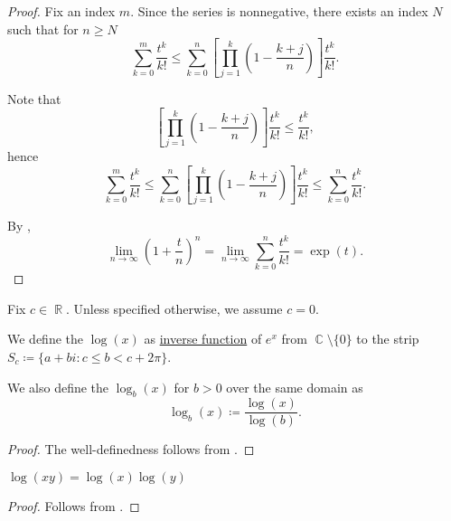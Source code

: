 \begin{proof}
  Fix an index \( m \). Since the series is nonnegative, there exists an index \( N \) such that for \( n \geq N \)
  \begin{equation*}
    \sum_{k=0}^m \frac {t^k} {k!}
    \leq
    \sum_{k=0}^n \left[ \prod_{j=1}^k \left(1 - \frac {k+j} n \right) \right] \frac {t^k} {k!}.
  \end{equation*}

  Note that
  \begin{equation*}
    \left[ \prod_{j=1}^k \left(1 - \frac {k+j} n \right) \right] \frac {t^k} {k!}
    \leq
    \frac {t^k} {k!},
  \end{equation*}
  hence
  \begin{equation*}
    \sum_{k=0}^m \frac {t^k} {k!}
    \leq
    \sum_{k=0}^n \left[ \prod_{j=1}^k \left(1 - \frac {k+j} n \right) \right] \frac {t^k} {k!}
    \leq
    \sum_{k=0}^n \frac {t^k} {k!}.
  \end{equation*}

  By ,
  \begin{equation*}
    \lim_{n \to \infty} \left(1 + \frac t n \right)^n
    =
    \lim_{n \to \infty} \sum_{k=0}^n \frac {t^k} {k!}
    =
    \exp(t).
  \end{equation*}
\end{proof}

\begin{definition}\label{def:logarithm}
  Fix \( c \in \BbbR \). Unless specified otherwise, we assume \( c = 0 \).

  We define the  \( \log(x) \) as \hyperref[def:function/inverse]{inverse function} of \( e^x \) from \( \BbbC \setminus \{ 0 \} \) to the strip \( S_c \coloneqq \{ a + bi \colon c \leq b < c + 2\pi \} \).

  We also define the  \( \log_b(x) \) for \( b > 0 \) over the same domain as
  \begin{equation*}
    \log_b(x) \coloneqq \frac {\log(x)} {\log(b)}.
  \end{equation*}
\end{definition}
\begin{proof}
  The well-definedness follows from .
\end{proof}

\begin{proposition}\label{thm:logarithm_properties}
  \hfill
  \begin{propenum}
     \( \log(xy) = \log(x) \log(y) \)
  \end{propenum}
\end{proposition}
\begin{proof}
   Follows from .
\end{proof}

